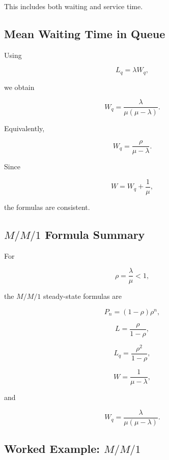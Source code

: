 This includes both waiting and service time.

\subsection{Mean Waiting Time in Queue}
\label{subsec:mm1-Wq}

Using

\[
L_q
=
\lambda W_q,
\]

we obtain

\[
\boxed{
W_q
=
\frac{
\lambda
}{
\mu(\mu-\lambda)
}.
}
\]

Equivalently,

\[
\boxed{
W_q
=
\frac{
\rho
}{
\mu-\lambda
}.
}
\]

Since

\[
W
=
W_q+\frac1\mu,
\]

the formulas are consistent.

\subsection{\(M/M/1\) Formula Summary}
\label{subsec:mm1-formula-summary}

For

\[
\boxed{
\rho
=
\frac{\lambda}{\mu}
<
1,
}
\]

the \(M/M/1\) steady-state formulas are

\[
\boxed{
P_n
=
(1-\rho)\rho^n,
}
\]

\[
\boxed{
L
=
\frac{\rho}{1-\rho},
}
\]

\[
\boxed{
L_q
=
\frac{\rho^2}{1-\rho},
}
\]

\[
\boxed{
W
=
\frac1{\mu-\lambda},
}
\]

and

\[
\boxed{
W_q
=
\frac{\lambda}{
\mu(\mu-\lambda)
}.
}
\]

\subsection{Worked Example: \(M/M/1\)}
\label{subsec:worked-mm1}


